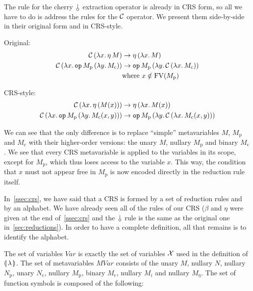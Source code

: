 The rule for the cherry $\cherry$ extraction operator is already in CRS
form, so all we have to do is address the rules for the $\mathcal{C}$ operator. We
present them side-by-side in their original form and in CRS-style.

Original:
\begin{align*}
  \mathcal{C}\,(\lambda x.\, \eta\,M) & \to \eta\,(\lambda x.\, M) \\
  \mathcal{C}\,(\lambda x.\, \mathtt{op}\,M_{\mathrm{p}}\,(\lambda y.\, M_{\mathrm{c}}))
  & \to
  \mathtt{op}\,M_{\mathrm{p}}\,(\lambda y.\, \mathcal{C}\,(\lambda x.\, M_{\mathrm{c}})) \\
  & \mathrm{where\ } x \notin \operatorname{FV}(M_{\mathrm{p}})
\end{align*}

CRS-style:
\begin{align*}
  \mathcal{C}\,(\lambda x.\, \eta\,(M(x))) & \to \eta\,(\lambda x.\, M(x)) \\
  \mathcal{C}\,(\lambda x.\, \mathtt{op}\,M_{\mathrm{p}}\,(\lambda y.\, M_{\mathrm{c}}(x,y)))
  & \to \mathtt{op}\,M_{\mathrm{p}}\,(\lambda y.\, \mathcal{C}\,(\lambda x.\, M_{\mathrm{c}}(x,y)))
\end{align*}

We can see that the only difference is to replace ``simple'' metavariables
$M$, $M_{\mathrm{p}}$ and $M_{\mathrm{c}}$ with their higher-order
versions: the unary $M$, nullary $M_{\mathrm{p}}$ and binary
$M_{\mathrm{c}}$. We see that every CRS metavariable is applied to the
variables in its scope, except for $M_{\mathrm{p}}$, which thus loses
access to the variable $x$. This way, the condition that $x$ must not
appear free in $M_{\mathrm{p}}$ is now encoded directly in the reduction
rule itself.

In~\ref{ssec:crs}, we have said that a CRS is formed by a set of reduction
rules and by an alphabet. We have already seen all of the rules of our CRS
($\beta$ and $\eta$ were given at the end of~\ref{ssec:crs} and the
$\cherry$ rule is the same as the original one in~\ref{sec:reductions}). In
order to have a complete definition, all that remains is to identify the
alphabet.

The set of variables $Var$ is exactly the set of variables $\mathcal{X}$ used in
the definition of $\llparenthesis \, \lambda \, \rrparenthesis$. The set of metavariables $MVar$
consists of the unary $M$, nullary $N$, nullary $N_{\mathrm{p}}$, unary
$N_{\mathrm{c}}$, nullary $M_{\mathrm{p}}$, binary $M_{\mathrm{c}}$,
nullary $M_i$ and nullary $M_\eta$. The set of function symbols is composed
of the following:

